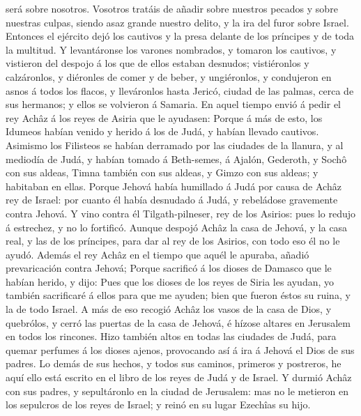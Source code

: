 será sobre nosotros. Vosotros tratáis de añadir sobre nuestros pecados y
sobre nuestras culpas, siendo asaz grande nuestro delito, y la ira del
furor sobre Israel.  Entonces el ejército dejó los
cautivos y la presa delante de los príncipes y de toda la multitud.
 Y levantáronse los varones nombrados, y tomaron los
cautivos, y vistieron del despojo á los que de ellos estaban desnudos;
vistiéronlos y calzáronlos, y diéronles de comer y de beber, y
ungiéronlos, y condujeron en asnos á todos los flacos, y lleváronlos
hasta Jericó, ciudad de las palmas, cerca de sus hermanos; y ellos se
volvieron á Samaria.  En aquel tiempo envió á pedir el
rey Achâz á los reyes de Asiria que le ayudasen:  Porque
á más de esto, los Idumeos habían venido y herido á los de Judá, y
habían llevado cautivos.  Asimismo los Filisteos se
habían derramado por las ciudades de la llanura, y al mediodía de Judá,
y habían tomado á Beth-semes, á Ajalón, Gederoth, y Sochô con sus
aldeas, Timna también con sus aldeas, y Gimzo con sus aldeas; y
habitaban en ellas.  Porque Jehová había humillado á Judá
por causa de Achâz rey de Israel: por cuanto él había desnudado á Judá,
y rebeládose gravemente contra Jehová.  Y vino contra él
Tilgath-pilneser, rey de los Asirios: pues lo redujo á estrechez, y no
lo fortificó.  Aunque despojó Achâz la casa de Jehová, y
la casa real, y las de los príncipes, para dar al rey de los Asirios,
con todo eso él no le ayudó.  Además el rey Achâz en el
tiempo que aquél le apuraba, añadió prevaricación contra Jehová;
 Porque sacrificó á los dioses de Damasco que le habían
herido, y dijo: Pues que los dioses de los reyes de Siria les ayudan, yo
también sacrificaré á ellos para que me ayuden; bien que fueron éstos su
ruina, y la de todo Israel.  A más de eso recogió Achâz
los vasos de la casa de Dios, y quebrólos, y cerró las puertas de la
casa de Jehová, é hízose altares en Jerusalem en todos los rincones.
 Hizo también altos en todas las ciudades de Judá, para
quemar perfumes á los dioses ajenos, provocando así á ira á Jehová el
Dios de sus padres.  Lo demás de sus hechos, y todos sus
caminos, primeros y postreros, he aquí ello está escrito en el libro de
los reyes de Judá y de Israel.  Y durmió Achâz con sus
padres, y sepultáronlo en la ciudad de Jerusalem: mas no le metieron en
los sepulcros de los reyes de Israel; y reinó en su lugar Ezechîas su
hijo.

